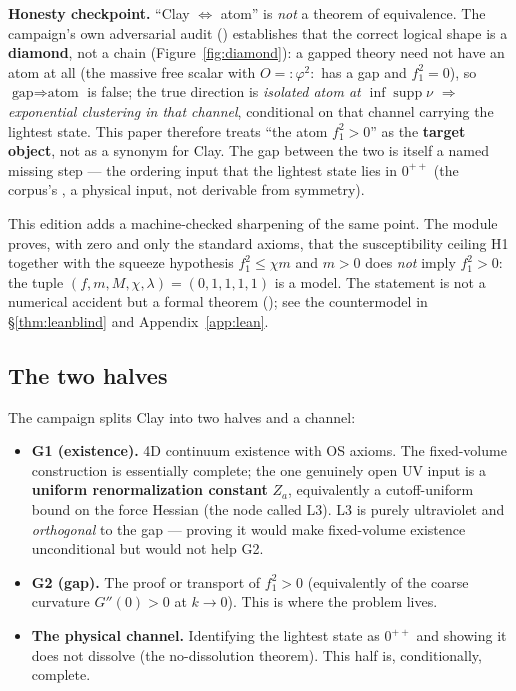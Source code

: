 \textbf{Honesty checkpoint.} ``Clay $\iff$ atom'' is \emph{not} a theorem of equivalence. The
campaign's own adversarial audit () establishes
that the correct logical shape is a \textbf{diamond}, not a chain
(Figure~\ref{fig:diamond}): a gapped theory need not have an atom at all (the massive free scalar
with $O={:}\varphi^2{:}$ has a gap and $f_1^2=0$), so $\text{gap}\Rightarrow\text{atom}$ is false;
the true direction is \emph{isolated atom at $\inf\operatorname{supp}\nu$ $\Rightarrow$
exponential clustering in that channel}, conditional on that channel carrying the lightest
state. This paper therefore treats ``the atom $f_1^2>0$'' as the \textbf{target object}, not as a
synonym for Clay. The gap between the two is itself a named missing step --- the ordering input
that the lightest state lies in $0^{++}$ (the corpus's , a physical input, not
derivable from symmetry).

This edition adds a machine-checked sharpening of the same point. The module
 proves, with zero  and only the standard
axioms, that the susceptibility ceiling H1 together with the squeeze hypothesis $f_1^2\le\chi m$
and $m>0$ does \emph{not} imply $f_1^2>0$: the tuple $(f,m,M,\chi,\lambda)=(0,1,1,1,1)$ is a
model. The statement is not a numerical accident but a formal theorem
(); see the countermodel in \S\ref{thm:leanblind} and
Appendix~\ref{app:lean}.

\figreduction

\subsection{The two halves}

The campaign splits Clay into two halves and a channel:

\begin{itemize}
\item \textbf{G1 (existence).} 4D continuum existence with OS axioms. The fixed-volume
  construction is essentially complete; the one genuinely open UV input is a \textbf{uniform
  renormalization constant} $Z_a$, equivalently a cutoff-uniform bound on the force Hessian (the
  node called L3). L3 is purely ultraviolet and \emph{orthogonal} to the gap --- proving it would
  make fixed-volume existence unconditional but would not help G2.
\item \textbf{G2 (gap).} The proof or transport of $f_1^2>0$ (equivalently of the coarse curvature
  $G''(0)>0$ at $k\to0$). This is where the problem lives.
\item \textbf{The physical channel.} Identifying the lightest state as $0^{++}$ and showing it
  does not dissolve (the no-dissolution theorem). This half is, conditionally, complete.
\end{itemize}

